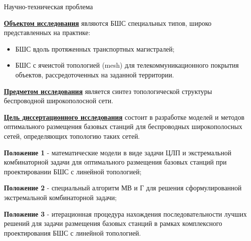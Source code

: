 \begin{frame}
    {Научно-техническая проблема}

    \textbf{\underline{Объектом исследования}} являются БШС специальных типов, широко представленных на практике:
    
    \bigskip

    \begin{itemize}
        \item БШС вдоль протяженных транспортных магистралей;
        \item БШС с ячеистой топологией (mesh) для телекоммуникационного покрытия объектов, рассредоточенных на заданной территории.
    \end{itemize}

    \bigskip

    \textbf{\underline{Предметом исследования}} является синтез топологической структуры беспроводной широкополосной сети.

    \bigskip
    
    \textbf{\underline{Цель диссертационного исследования}} состоит в разработке моделей и методов оптимального размещения базовых станций для беспроводных широкополосных сетей, определяющих топологию таких сетей.

\end{frame}

\begin{frame}
    \justifying
    \begin{center}
        {\textbf{Положение 1} - математические модели в виде задачи ЦЛП и экстремальной комбинаторной задачи для оптимального размещения базовых станций при проектировании БШС с линейной топологией;}
        \bigskip
        
        {\textbf{Положение 2} - специальный алгоритм МВ и Г для решения сформулированной
        экстремальной комбинаторной задачи;}
        \bigskip

        {\textbf{Положение 3} - итерационная процедура нахождения последовательности лучших
        решений для задачи размещения базовых станций в рамках комплексного
        проектирования БШС с линейной топологией.}
    \end{center}
\end{frame}


